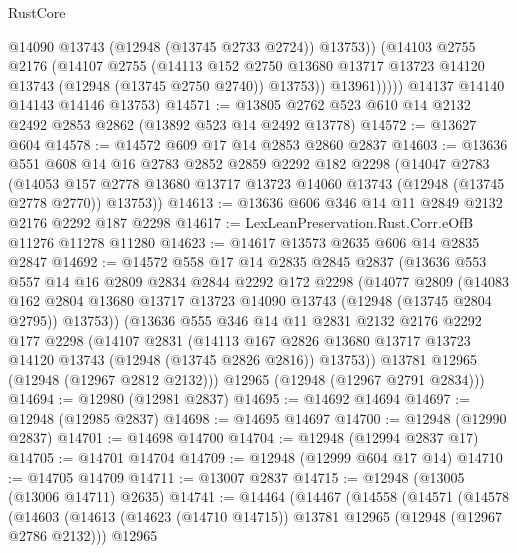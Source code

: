 \begin{lexlean}{RustCore}
\begin{coremodule}
                  @14090
                  @13743
                  (@12948 (@13745 @2733 @2724))
                  @13753))
              (@14103
                @2755
                @2176
                (@14107
                  @2755
                  (@14113
                    @152
                    @2750
                    @13680
                    @13717
                    @13723
                    @14120
                    @13743
                    (@12948 (@13745 @2750 @2740))
                    @13753))
                @13961)))))
      @14137
      @14140
      @14143
      @14146
      @13753)
@14571 := @13805 @2762 @523 @610 @14 @2132 @2492 @2853 @2862 (@13892 @523 @14 @2492 @13778)
@14572 := @13627 @604
@14578 := @14572 @609 @17 @14 @2853 @2860 @2837
@14603 := @13636
    @551
    @608
    @14
    @16
    @2783
    @2852
    @2859
    @2292
    @182
    @2298
    (@14047
      @2783
      (@14053 @157 @2778 @13680 @13717 @13723 @14060 @13743 (@12948 (@13745 @2778 @2770)) @13753))
@14613 := @13636 @606 @346 @14 @11 @2849 @2132 @2176 @2292 @187 @2298
@14617 := LexLeanPreservation.Rust.Corr.eOfB @11276 @11278 @11280
@14623 := @14617 @13573 @2635 @606 @14 @2835 @2847
@14692 := @14572
    @558
    @17
    @14
    @2835
    @2845
    @2837
    (@13636
      @553
      @557
      @14
      @16
      @2809
      @2834
      @2844
      @2292
      @172
      @2298
      (@14077
        @2809
        (@14083 @162 @2804 @13680 @13717 @13723 @14090 @13743 (@12948 (@13745 @2804 @2795)) @13753))
      (@13636
        @555
        @346
        @14
        @11
        @2831
        @2132
        @2176
        @2292
        @177
        @2298
        (@14107
          @2831
          (@14113
            @167
            @2826
            @13680
            @13717
            @13723
            @14120
            @13743
            (@12948 (@13745 @2826 @2816))
            @13753))
        @13781
        @12965
        (@12948 (@12967 @2812 @2132)))
      @12965
      (@12948 (@12967 @2791 @2834)))
@14694 := @12980 (@12981 @2837)
@14695 := @14692 @14694
@14697 := @12948 (@12985 @2837)
@14698 := @14695 @14697
@14700 := @12948 (@12990 @2837)
@14701 := @14698 @14700
@14704 := @12948 (@12994 @2837 @17)
@14705 := @14701 @14704
@14709 := @12948 (@12999 @604 @17 @14)
@14710 := @14705 @14709
@14711 := @13007 @2837
@14715 := @12948 (@13005 (@13006 @14711) @2635)
@14741 := @14464
    (@14467
      (@14558
        (@14571
          (@14578
            (@14603
              (@14613 (@14623 (@14710 @14715)) @13781 @12965 (@12948 (@12967 @2786 @2132)))
              @12965

\end{coremodule}
\end{lexlean}
